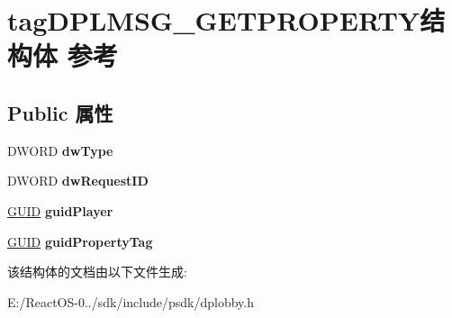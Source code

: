 \hypertarget{structtag_d_p_l_m_s_g___g_e_t_p_r_o_p_e_r_t_y}{}\section{tag\+D\+P\+L\+M\+S\+G\+\_\+\+G\+E\+T\+P\+R\+O\+P\+E\+R\+T\+Y结构体 参考}
\label{structtag_d_p_l_m_s_g___g_e_t_p_r_o_p_e_r_t_y}
\subsection*{Public 属性}
\begin{DoxyCompactItemize}
\item 
\mbox{\label{structtag_d_p_l_m_s_g___g_e_t_p_r_o_p_e_r_t_y_a2ffc05f82ac878063a8082e1a60419ae}} 
D\+W\+O\+RD {\bfseries dw\+Type}
\item 
\mbox{\label{structtag_d_p_l_m_s_g___g_e_t_p_r_o_p_e_r_t_y_a4a0dd8a9d615a6d7013caece4c572fa5}} 
D\+W\+O\+RD {\bfseries dw\+Request\+ID}
\item 
\mbox{\label{structtag_d_p_l_m_s_g___g_e_t_p_r_o_p_e_r_t_y_a51f90d0f9111e03e08634b66e59b8236}} 
\hyperlink{interface_g_u_i_d}{G\+U\+ID} {\bfseries guid\+Player}
\item 
\mbox{\label{structtag_d_p_l_m_s_g___g_e_t_p_r_o_p_e_r_t_y_a93aa84fd9335e6a3166ecbe0859664b9}} 
\hyperlink{interface_g_u_i_d}{G\+U\+ID} {\bfseries guid\+Property\+Tag}
\end{DoxyCompactItemize}


该结构体的文档由以下文件生成\+:\begin{DoxyCompactItemize}
\item 
E\+:/\+React\+O\+S-\/0../sdk/include/psdk/dplobby.\+h\end{DoxyCompactItemize}
